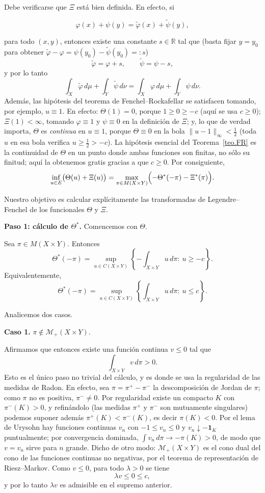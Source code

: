 \documentclass[12pt, a4paper]{amsbook}
\theoremstyle{remark}
\theoremstyle{definition}
\numberwithin{section}{chapter}
\numberwithin{subsection}{section}
\numberwithin{equation}{section}
\numberwithin{figure}{chapter}
\begin{document}
Debe verificarse que $\Xi$ está bien definida. En efecto, si

\[
\varphi(x)+\psi(y)
=
\widetilde\varphi(x)+\widetilde\psi(y),
\]

para todo $(x,y)$, entonces existe una constante $s\in\mathbb R$ tal que
(basta fijar $y=y_0$ para obtener
$\widetilde\varphi-\varphi=\psi(y_0)-\widetilde\psi(y_0)=:s$)
\[
\widetilde\varphi=\varphi+s,
\qquad
\widetilde\psi=\psi-s,
\]
y por lo tanto
\[
\int_X\widetilde\varphi\,d\mu
+
\int_Y\widetilde\psi\,d\nu
=
\int_X\varphi\,d\mu
+
\int_Y\psi\,d\nu.
\]
Además, las hipótesis del teorema de Fenchel--Rockafellar se satisfacen
tomando, por ejemplo, $u\equiv1$. En efecto: $\Theta(1)=0$, porque
$1\ge0\ge-c$ (aquí se usa $c\ge0$); $\Xi(1)<\infty$, tomando $\varphi\equiv1$
y $\psi\equiv0$ en la definición de $\Xi$; y, lo que de verdad importa,
$\Theta$ es \emph{continua} en $u\equiv1$, porque $\Theta\equiv0$ en la bola
$\|u-1\|_\infty<\frac12$ (toda $u$ en esa bola verifica $u\ge\frac12>-c$). La
hipótesis esencial del Teorema~\ref{teo.FR} es la continuidad de $\Theta$ en
un punto donde ambas funciones son finitas, no sólo su finitud; aquí la
obtenemos gratis gracias a que $c\ge0$.
Por consiguiente,
\[
\inf_{u\in E}
\bigl(
\Theta(u)+\Xi(u)
\bigr)
=
\max_{\pi\in M(X\times Y)}
\Bigl(
-\Theta^*(-\pi)
-
\Xi^*(\pi)
\Bigr).
\]

Nuestro objetivo es calcular explícitamente las transformadas de
Legendre--Fenchel de los funcionales $\Theta$ y $\Xi$.

\medskip\noindent\textbf{Paso 1: cálculo de $\Theta^*$.}
Comencemos con $\Theta$.

Sea $\pi\in M(X\times Y)$. Entonces
\[
\Theta^*(-\pi)
=
\sup_{u\in C(X\times Y)}
\left\{
-\int_{X\times Y}u\,d\pi
:\ 
u\ge -c
\right\}.
\]
Equivalentemente,
\[
\Theta^*(-\pi)
=
\sup_{u\in C(X\times Y)}
\left\{
\int_{X\times Y}u\,d\pi
:\ 
u\le c
\right\}.
\]

Analicemos dos casos.

\medskip

\noindent
\textbf{Caso 1.} $\pi\notin \mathcal M_+(X\times Y)$.

Afirmamos que entonces existe una función continua $v\le0$ tal que
\[
\int_{X\times Y}v\,d\pi>0.
\]
Esto es el único paso no trivial del cálculo, y es donde se usa la
regularidad de las medidas de Radon. En efecto, sea $\pi=\pi^+-\pi^-$ la
descomposición de Jordan de $\pi$; como $\pi$ no es positiva, $\pi^-\neq0$.
Por regularidad existe un compacto $K$ con $\pi^-(K)>0$, y refinándolo (las
medidas $\pi^+$ y $\pi^-$ son mutuamente singulares) podemos suponer además
$\pi^+(K)<\pi^-(K)$, es decir $\pi(K)<0$. Por el lema de Urysohn hay
funciones continuas $v_n$ con $-1\le v_n\le0$ y $v_n\downarrow-\mathbf
1_K$ puntualmente; por convergencia dominada,
$\int v_n\,d\pi\to-\pi(K)>0$, de modo que $v=v_n$ sirve para $n$ grande.
Dicho de otro modo: $\mathcal M_+(X\times Y)$ es el cono dual del cono de las
funciones continuas no negativas, por el teorema de representación de
Riesz--Markov.
Como $v\le0$, para todo $\lambda>0$ se tiene
\[
\lambda v\le0\le c,
\]
y por lo tanto $\lambda v$ es admisible en el supremo anterior.
\end{document}
